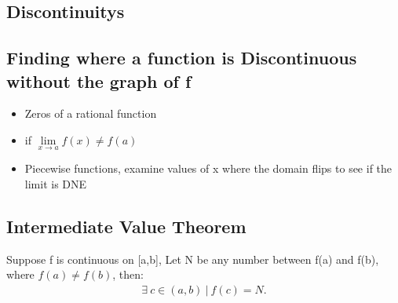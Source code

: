 \documentclass{report}
\begin{document}
      \pagebreak \bigbreak \noindent
      \subsection{Discontinuitys}
      \begin{figure}[h]
          \centering
          \label{fig:removeable}
      \end{figure}

      \begin{figure}[h]
          \centering
          \label{fig:infinity}
      \end{figure}

      \bigbreak \noindent \bigbreak \noindent
      \subsection{Finding where a function is Discontinuous without the graph of f}
      \begin{itemize}
        \item Zeros of a rational function
        \item if $ \lim\limits_{x \to a}{f(x) \neq f(a)} $
        \item Piecewise functions, examine values of x where the domain flips to see if the limit is DNE
      \end{itemize}

      \bigbreak \noindent \bigbreak \noindent 
      \subsection{Intermediate Value Theorem}
      \bigbreak \noindent \bigbreak \noindent
      Suppose f is continuous on [a,b], Let N be any number between f(a) and f(b), where $f(a) \neq f(b)$, then:
      \begin{align*}
        \exists\ c \in (a,b)\ |\ f(c) = N
      .\end{align*}

      

      \pagebreak \bigbreak \noindent
\end{document}

